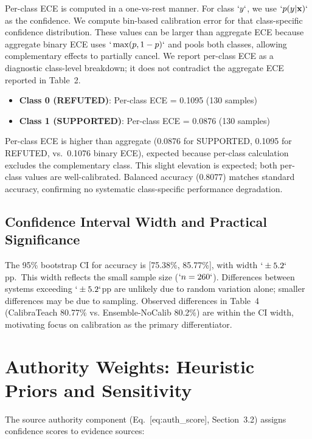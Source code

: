 Per-class ECE is computed in a one-vs-rest manner. For class \(`y`\), we use \(`p(y|\mathbf{x})`\) as the confidence. We compute bin-based calibration error for that class-specific confidence distribution. These values can be larger than aggregate ECE because aggregate binary ECE uses \(`\max(p, 1-p)`\) and pools both classes, allowing complementary effects to partially cancel. We report per-class ECE as a diagnostic class-level breakdown; it does not contradict the aggregate ECE reported in Table~2.

\begin{itemize}
\item
  \textbf{Class 0 (REFUTED)}: Per-class ECE = 0.1095 (130 samples)
\item
  \textbf{Class 1 (SUPPORTED)}: Per-class ECE = 0.0876 (130 samples)
\end{itemize}

Per-class ECE is higher than aggregate (0.0876 for SUPPORTED, 0.1095 for REFUTED, vs.~0.1076 binary ECE), expected because per-class calculation excludes the complementary class. This slight elevation is expected; both per-class values are well-calibrated. Balanced accuracy (0.8077) matches standard accuracy, confirming no systematic class-specific performance degradation.

\subsection{Confidence Interval Width and Practical Significance}\label{confidence-interval-width-and-practical-significance}

The 95\% bootstrap CI for accuracy is {[}75.38\%, 85.77\%{]}, with width \(`\pm 5.2`\)pp.~This width reflects the small sample size (\(`n=260`\)). Differences between systems exceeding \(`\pm 5.2`\)pp are unlikely due to random variation alone; smaller differences may be due to sampling. Observed differences in Table~4 (CalibraTeach 80.77\% vs. Ensemble-NoCalib 80.2\%) are within the CI width, motivating focus on calibration as the primary differentiator.

\section{Authority Weights: Heuristic Priors and Sensitivity}\label{authority-weights-heuristic-priors-and-sensitivity}

The source authority component (Eq.~{[}eq:auth\_score{]}, Section~3.2) assigns confidence scores to evidence sources:

